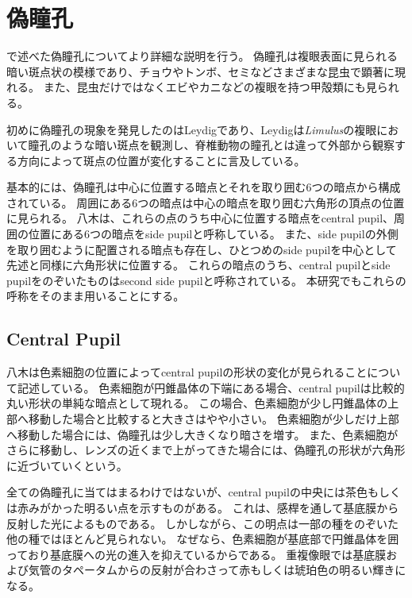 \section{偽瞳孔}
\label{SPseudopupil}

で述べた偽瞳孔についてより詳細な説明を行う。
偽瞳孔は複眼表面に見られる暗い斑点状の模様であり、チョウやトンボ、セミなどさまざまな昆虫で顕著に現れる。
また、昆虫だけではなくエビやカニなどの複眼を持つ甲殻類にも見られる。


初めに偽瞳孔の現象を発見したのはLeydig\cite{}であり、Leydigは{\it Limulus}の複眼において瞳孔のような暗い斑点を観測し、脊椎動物の瞳孔とは違って外部から観察する方向によって斑点の位置が変化することに言及している。

基本的には、偽瞳孔は中心に位置する暗点とそれを取り囲む6つの暗点から構成されている。
周囲にある6つの暗点は中心の暗点を取り囲む六角形の頂点の位置に見られる。
八木\cite{}は、これらの点のうち中心に位置する暗点をcentral pupil、周囲の位置にある6つの暗点をside pupilと呼称している。
また、side pupilの外側を取り囲むように配置される暗点も存在し、ひとつめのside pupilを中心として先述と同様に六角形状に位置する。
これらの暗点のうち、central pupilとside pupilをのぞいたものはsecond side pupilと呼称されている。
本研究でもこれらの呼称をそのまま用いることにする。

\subsection{Central Pupil}
\label{SSCentralPupil}

八木は色素細胞の位置によってcentral pupilの形状の変化が見られることについて記述している。
色素細胞が円錐晶体の下端にある場合\figref{}、central pupilは比較的丸い形状の単純な暗点として現れる。
この場合、色素細胞が少し円錐晶体の上部へ移動した場合と比較すると大きさはやや小さい。
色素細胞が少しだけ上部へ移動した場合には、偽瞳孔は少し大きくなり暗さを増す。
また、色素細胞がさらに移動し、レンズの近くまで上がってきた場合には、偽瞳孔の形状が六角形に近づいていくという。

全ての偽瞳孔に当てはまるわけではないが、central pupilの中央には茶色もしくは赤みがかった明るい点を示すものがある。
これは、感桿を通して基底膜から反射した光によるものである。
しかしながら、この明点は一部の種をのぞいた他の種ではほとんど見られない。
なぜなら、色素細胞が基底部で円錐晶体を囲っており基底膜への光の進入を抑えているからである。
重複像眼では基底膜および気管のタペータムからの反射が合わさって赤もしくは琥珀色の明るい輝きになる。

